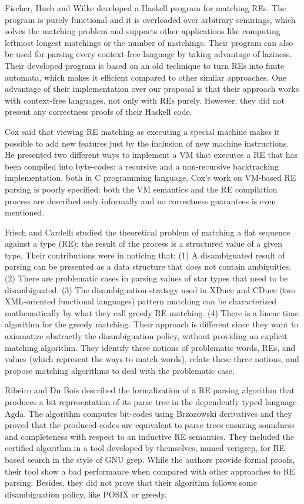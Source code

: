 Fischer, Huch and Wilke \cite{Fischer2010} developed a Haskell program for matching REs. The program is purely
functional and it is overloaded over arbitrary semirings, which solves the matching problem and supports other
applications like computing leftmost longest matchings or the number of matchings. Their program can also be used
for parsing every context-free language by taking advantage of laziness. Their developed program is based on an
old technique to turn REs into finite automata, which makes it efficient compared to other similar approaches.
One advantage of their implementation over our proposal is that their approach works with context-free languages,
not only with REs purely. However, they did not present any correctness proofs of their Haskell code.


Cox \cite{Cox2009} said that viewing RE matching as executing a special machine makes it possible to add new
features just by the inclusion of new machine instructions. He presented two different ways to implement
a VM that executes a RE that has been compiled into  byte-codes: a recursive and a non-recursive
backtracking implementation, both in C programming language. Cox's work on VM-based RE parsing is poorly specified:
both the VM semantics and the RE compilation process are described only informally
and no correctness guarantees is even mentioned.


Frisch and Cardelli \cite{Frisch2004} studied the theoretical problem of matching a flat sequence against a type (RE): the
result of the process is a structured value of a given type. Their contributions were in noticing that: (1) A disambiguated
result of parsing can be presented as a data structure that does not contain ambiguities. (2) There are problematic cases in
parsing values of star types that need to be disambiguated. (3) The disambiguation strategy used in XDuce and CDuce (two
XML-oriented functional languages) pattern matching can be characterized mathematically by what they call greedy RE matching.
(4) There is a linear time algorithm for the greedy matching. Their approach is different since they want to axiomatize abstractly
the disambiguation policy, without providing an explicit matching algorithm. They identify three notions of problematic words, REs,
and values (which represent the ways to match words), relate these three notions, and propose matching algorithms to deal with the
problematic case.


Ribeiro and Du Bois \cite{Ribeiro2017} described the formalization of a RE parsing algorithm that produces a bit representation
of its parse tree in the dependently typed language Agda. The algorithm computes bit-codes using Brzozowski derivatives and
they proved that the produced codes are equivalent to parse trees ensuring soundness and completeness with respect to an
inductive RE semantics. They included the certified algorithm in a tool developed by themselves, named verigrep, for RE-based
search in the style of GNU grep. While the authors provide formal proofs, their tool show a bad performance when compared with
other approaches to RE parsing. Besides, they did not prove that their algorithm follows some disambiguation policy, like POSIX
or greedy.


